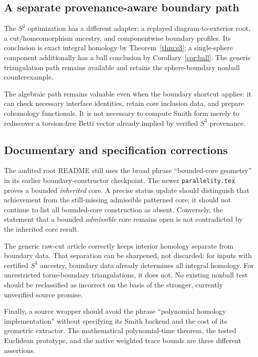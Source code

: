 \documentclass[11pt]{article}
\theoremstyle{definition}
\theoremstyle{remark}
\newcommand{\code}[1]{\texttt{#1}}
\begin{document}
\subsection{A separate provenance-aware boundary path}
The $S^3$ optimization has a different adapter: a replayed diagram-to-exterior
root, a cut/homeomorphism ancestry, and componentwise boundary profiles.
Its conclusion is exact integral homology by Theorem~\ref{thm:s3}; a
single-sphere component additionally has a ball conclusion by
Corollary~\ref{cor:ball}. The generic triangulation path remains available
and retains the sphere-boundary nonball counterexample.

The algebraic path remains valuable even when the boundary shortcut applies:
it can check necessary interface identities, retain core inclusion data,
and prepare cohomology functionals. It is not necessary to compute Smith
form merely to rediscover a torsion-free Betti vector already implied by
verified $S^3$ provenance.

\subsection{Documentary and specification corrections}
The audited root README still uses the broad phrase ``bounded-core geometry''
in its earlier boundary-constructor checkpoint. The newer
\code{parallelity.tex} proves a bounded \emph{inherited} core. A precise
status update should distinguish that achievement from the still-missing
admissible patterned core; it should not continue to list all bounded-core
construction as absent. Conversely, the statement that a bounded
\emph{admissible} core remains open is not contradicted by the inherited
core result.

The generic raw-cut article correctly keeps interior homology separate from
boundary data. That separation can be sharpened, not discarded: for inputs
with certified $S^3$ ancestry, boundary data already determines all integral
homology. For unrestricted torus-boundary triangulations, it does not.
No existing nonball test should be reclassified as incorrect on the basis
of the stronger, currently unverified source promise.

Finally, a source wrapper should avoid the phrase ``polynomial homology
implementation'' without specifying its Smith backend and the cost of its
geometric extractor. The mathematical polynomial-time theorem, the tested
Euclidean prototype, and the native weighted trace bounds are three
different assertions.
\end{document}

